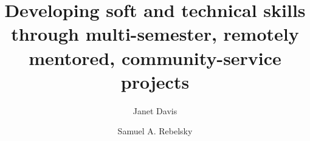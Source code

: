 \documentclass[sigconf]{acmart}
\begin{document}
\title[Multi-semester, remotely mentored, community service projects]{Developing soft and technical skills through multi-semester, remotely mentored, community-service projects}

\author{Janet Davis}

\author{Samuel A. Rebelsky}







\maketitle

\newcommand{\college}{Grinnell}






 
\end{document}
